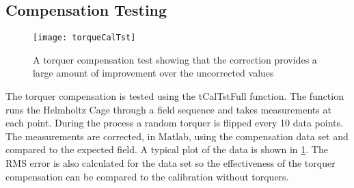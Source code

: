 \begin{comment}
\subsection{Torquer offsets}

\begin{figure}[!ht]
    \centering
    \texttt{[image: board-offsets]}
    \caption{Board offsets}
    \label{fig:b-offset}
\end{figure}

Because of the nature of the dipole magnetic field, the offsets measured by each magnetometer are unique to each magnetometer and torquer combination. Some torquers have only a small effect on each magnetometer and some have a much larger effect. \Cref{fig:b-offset} shows the offsets when the torquers are stepped through all possible states. The offsets are calculated for each board by sweeping the Helmholtz cage through a field pattern in the plane of each board. The offsets are rotated from the \ac{SPB} frame into the satellite frame and plotted on the same axis for comparison.

In \Cref{fig:b-offset} the largest offset appears to be both of the Y-axis torquers and one of the X-axis torquers cting on the X-axis \ac{SPB} in the Z-axis. When all three torquers are biased in a positive direction the offset is around 1.5 Gauss. When all three torquers are biased in the negative direction the offset is around -1.7 gauss.

\end{comment}

\subsection{Compensation Testing}

\begin{figure}[!ht]
    \centering
    \texttt{[image: torqueCalTst]}
  \caption{A torquer compensation test showing that the correction provides a large amount of improvement over the uncorrected values}
    \label{fig:tqtst}
\end{figure}

The torquer compensation is tested using the tCalTstFull function. The function runs the Helmholtz Cage through a field sequence and takes measurements at each point. During the process a random torquer is flipped every 10 data points. The measurements are corrected, in Matlab, using the compensation data set and compared to the expected field. A typical plot of the data is shown in \cref{fig:tqtst}. The RMS error is also calculated for the data set so the effectiveness of the torquer compensation can be compared to the calibration without torquers.

